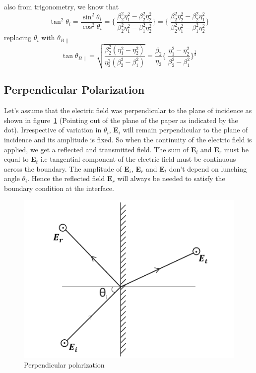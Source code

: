 also from trigonometry, we know that
\begin{equation*}
\tan^2\theta_i = \dfrac{\sin^2\theta_i}{\cos^2\theta_i} = \Bigg\{\ \dfrac{\beta^2_2\eta^2_1 - \beta^2_2\eta^2_2}{\beta^2_2\eta^2_1 - \beta^2_1\eta^2_2} \Bigg\} = \Bigg\{\ \dfrac{\beta^2_2\eta^2_2 - \beta^2_2\eta^2_1}{\beta^2_2\eta^2_1 - \beta^2_1\eta^2_2} \Bigg\}
\end{equation*}
replacing $\theta_i$ with $\theta_{B\parallel}$
\begin{equation}
\tan\theta_{B\parallel} = \sqrt{\dfrac{\beta^2_2(\eta^2_1 - \eta^2_2)}{\eta^2_2(\beta^2_2 - \beta^2_1)}} = \dfrac{\beta_2}{\eta_2}\Bigg\{\ \dfrac{\eta^2_1 - \eta^2_2}{\beta^2_2 - \beta^2_1} \Bigg\}^{\frac{1}{2}}
\end{equation}

\subsection{Perpendicular Polarization}
Let's assume that the electric field was perpendicular to the plane of incidence as shown in figure~\ref{fig:mcben1} (Pointing out of the plane of the paper as indicated by the dot). Irrespective of variation in $\theta_i$,  \textbf{E}$_i$ will remain perpendicular to the plane of incidence and its amplitude is fixed. So when the continuity of the electric field is applied, we get a reflected and transmitted field. The sum of \textbf{E}$_i$ and \textbf{E}$_r$ must be equal to \textbf{E}$_t$ i.e tangential component of the electric field must be continuous across the boundary. The amplitude of \textbf{E}$_i$, \textbf{E}$_r$ and \textbf{E}$_t$ don't depend on lunching angle $\theta_i$. Hence the reflected field \textbf{E}$_r$ will always be needed to satisfy the boundary condition at the interface.
\begin{figure}[h]
\centering
\includegraphics[width=1\linewidth]{./graphics/perpendicular_polarization4}
\caption{Perpendicular polarization}
\label{fig:mcben1}
\end{figure}

